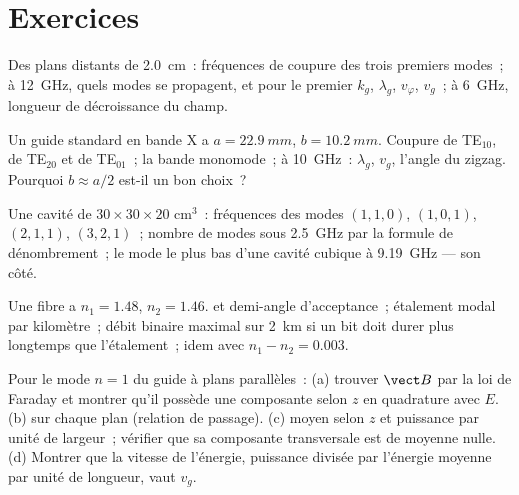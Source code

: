 \section{Exercices}

\begin{exercise}[$\star$]\label{exo:b2:guided-waves:1}
Des plans distants de \qty{2.0}{cm}~: fréquences de coupure des trois premiers modes~;
à \qty{12}{GHz}, quels modes se propagent, et pour le premier $k_g$,
$\lambda_g$, $v_\varphi$, $v_g$~; à \qty{6}{GHz}, longueur de décroissance du champ.
\end{exercise}

\begin{exercise}[$\star$]\label{exo:b2:guided-waves:2}
Un guide standard en bande X a $a = \qty{22.9}{mm}$, $b = \qty{10.2}{mm}$.
Coupure de TE$_{10}$, de TE$_{20}$ et de TE$_{01}$~; la bande monomode~; à
\qty{10}{GHz}~: $\lambda_g$, $v_g$, l'angle du zigzag. Pourquoi $b \approx a/2$
est-il un bon choix~?
\end{exercise}

\begin{exercise}[$\star$]\label{exo:b2:guided-waves:3}
Une cavité de $30 \times 30 \times 20$ cm$^3$~: fréquences des modes $(1,1,0)$,
$(1,0,1)$, $(2,1,1)$, $(3,2,1)$~; nombre de modes sous \qty{2.5}{GHz} par
la formule de dénombrement~; le mode le plus bas d'une cavité cubique à \qty{9.19}{GHz}
--- son côté.
\end{exercise}

\begin{exercise}[$\star$]\label{exo:b2:guided-waves:4}
Une fibre a $n_1 = 1.48$, $n_2 = 1.46$.  et demi-angle
d'acceptance~; étalement modal par kilomètre~; débit binaire maximal sur
\qty{2}{km} si un bit doit durer plus longtemps que l'étalement~; idem avec
$n_1 - n_2 = 0.003$.
\end{exercise}

\begin{exercise}[$\star\star$]\label{exo:b2:guided-waves:5}
Pour le mode $n = 1$ du guide à plans parallèles~: (a) trouver $\vect B$ par la loi
de Faraday et montrer qu'il possède une composante selon $z$ en quadrature avec $E$. (b)  sur chaque plan (relation de passage). (c)  moyen
selon $z$ et puissance par unité de largeur~; vérifier que sa composante
transversale est de moyenne nulle. (d) Montrer que la vitesse de l'énergie, puissance
divisée par l'énergie moyenne par unité de longueur, vaut $v_g$.
\end{exercise}

